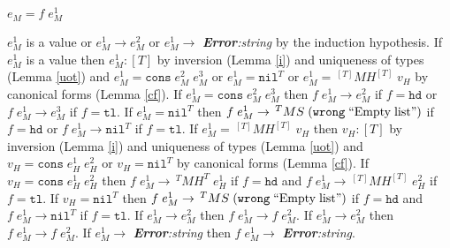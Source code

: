 \begin{case}
$e_{M}=f\;e_{M}^{1}$

$e_{M}^{1}$ is a value or $e_{M}^{1}\rightarrow e_{M}^{2}$ or $e_{M}^{1}\rightarrow$ \emph{\textbf{Error}:\;string} by the induction hypothesis.  If $e_{M}^{1}$ is a value then $e_{M}^{1}:[T]$ by inversion (Lemma \ref{i}) and uniqueness of types (Lemma \ref{uot}) and $e_{M}^{1}=\mathtt{cons}\;e_{M}^{2}\;e_{M}^{3}$ or $e_{M}^{1}=\mathtt{nil}^{T}$ or $e_{M}^{1}=\,^{[T]}MH^{[T]}\;v_{H}$ by canonical forms (Lemma \ref{cf}).  If $e_{M}^{1}=\mathtt{cons}\;e_{M}^{2}\;e_{M}^{3}$ then $f\;e_{M}^{1}\rightarrow e_{M}^{2}$ if $f=\mathtt{hd}$ or $f\;e_{M}^{1}\rightarrow e_{M}^{3}$ if $f=\mathtt{tl}$.  If $e_{M}^{1}=\mathtt{nil}^{T}$ then $f\;e_{M}^{1}\rightarrow\,^{T}MS\;(\mathtt{wrong}\;\mathrm{``Empty\;list"})$ if $f=\mathtt{hd}$ or $f\;e_{M}^{1}\rightarrow\mathtt{nil}^{T}$ if $f=\mathtt{tl}$.  If $e_{M}^{1}=\,^{[T]}MH^{[T]}\;v_{H}$ then $v_{H}:[T]$ by inversion (Lemma \ref{i}) and uniqueness of types (Lemma \ref{uot}) and $v_{H}=\mathtt{cons}\;e_{H}^{1}\;e_{H}^{2}$ or $v_{H}=\mathtt{nil}^{T}$ by canonical forms (Lemma \ref{cf}).  If $v_{H}=\mathtt{cons}\;e_{H}^{1}\;e_{H}^{2}$ then $f\;e_{M}^{1}\rightarrow\,^{T}MH^{T}\;e_{H}^{1}$ if $f=\mathtt{hd}$ and $f\;e_{M}^{1}\rightarrow\,^{[T]}MH^{[T]}\;e_{H}^{2}$ if $f=\mathtt{tl}$.  If $v_{H}=\mathtt{nil}^{T}$ then $f\;e_{M}^{1}\rightarrow\,^{T}MS\;(\mathtt{wrong}\;\mathrm{``Empty\;list"})$ if $f=\mathtt{hd}$ and $f\;e_{M}^{1}\rightarrow\mathtt{nil}^{T}$ if $f=\mathtt{tl}$.  If $e_{M}^{1}\rightarrow e_{M}^{2}$ then $f\;e_{M}^{1}\rightarrow f\;e_{M}^{2}$.  If $e_{M}^{1}\rightarrow e_{M}^{2}$ then $f\;e_{M}^{1}\rightarrow f\;e_{M}^{2}$.  If $e_{M}^{1}\rightarrow$ \emph{\textbf{Error}:\;string} then $f\;e_{M}^{1}\rightarrow$ \emph{\textbf{Error}:\;string}.
\end{case}